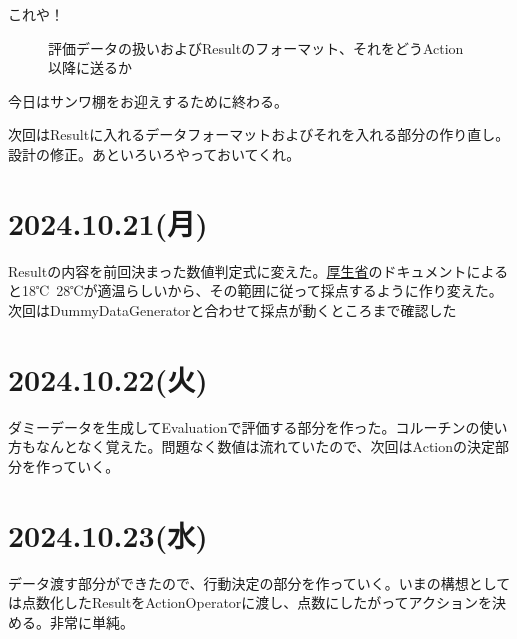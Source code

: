 \documentclass[fleqn,twocolumn]{mynote}
\begin{document}
  これや！
  \fboxsep=0pt            %
  \fboxrule=1pt            %
  \begin{figure}[h]
    \centering
    \caption{評価データの扱いおよびResultのフォーマット、それをどうAction以降に送るか}
    \label{fig:EcaluateFormat}
  \end{figure}

  今日はサンワ棚をお迎えするために終わる。

  次回はResultに入れるデータフォーマットおよびそれを入れる部分の作り直し。設計の修正。あといろいろやっておいてくれ。

  \section*{2024.10.21(月)}
  Resultの内容を前回決まった数値判定式に変えた。\href{https://www.mhlw.go.jp/content/11300000/000905329.pdf}{厚生省}のドキュメントによると18℃~28℃が適温らしいから、その範囲に従って採点するように作り変えた。次回はDummyDataGeneratorと合わせて採点が動くところまで確認した

  \section*{2024.10.22(火)}
  ダミーデータを生成してEvaluationで評価する部分を作った。コルーチンの使い方もなんとなく覚えた。問題なく数値は流れていたので、次回はActionの決定部分を作っていく。

  \section*{2024.10.23(水)}
  データ渡す部分ができたので、行動決定の部分を作っていく。いまの構想としては点数化したResultをActionOperatorに渡し、点数にしたがってアクションを決める。非常に単純。
\end{document}
